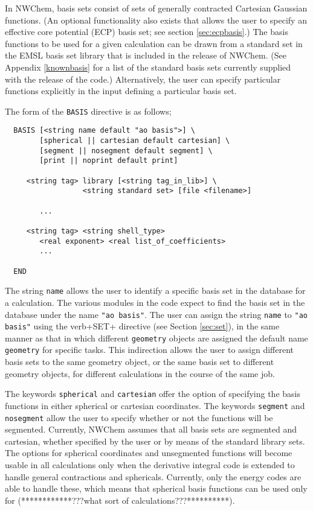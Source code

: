 \label{sec:basis}
In NWChem, basis sets consist of sets of generally contracted Cartesian
Gaussian functions.  (An optional functionality also exists that allows the
user to specify an effective core potential (ECP) basis set; see
section \ref{sec:ecpbasis}.)  The basis functions to be used for a given
calculation can be drawn from a standard set in the EMSL basis set library
that is included in the release of NWChem.  (See Appendix \ref{knownbasis} 
for a list of the standard basis sets currently supplied with the release 
of the code.)    Alternatively, the user can specify particular functions
explicitly in the input defining a particular basis set.  

The form of the \verb+BASIS+ directive is as follows;

\begin{verbatim}
  BASIS [<string name default "ao basis">] \
        [spherical || cartesian default cartesian] \
        [segment || nosegment default segment] \
        [print || noprint default print]

     <string tag> library [<string tag_in_lib>] \
                  <string standard set> [file <filename>]

        ...

     <string tag> <string shell_type>
        <real exponent> <real list_of_coefficients>
        ...
     
  END
\end{verbatim}    

The string \verb+name+ allows the user to identify a specific basis set
in the database for a calculation.  The various modules in the code expect 
to find the
basis set in the database under the name \verb+"ao basis"+.  The user can
assign the string \verb+name+ to \verb+"ao basis"+ using the verb+SET+
directive (see Section \ref{sec:set}), in the same manner as that in
which different 
\verb+geometry+ objects are assigned the default name \verb+geometry+ 
for specific tasks.  This indirection allows the user to assign different
basis sets to the same geometry object, or the same basis set to different
geometry objects, for different calculations in
the course of the same job.

The keywords \verb+spherical+ and \verb+cartesian+ offer the option of
specifying the basis functions in either spherical or cartesian coordinates.
The keywords \verb+segment+ and \verb+nosegment+ allow the user to specify
whether or not the functions will be segmented.  Currently, NWChem assumes
that all basis sets are segmented  and cartesian, whether specified by the 
user or by means of the standard library sets.
The options for spherical coordinates and unsegmented functions will become
usable in all calculations only when the derivative integral code is 
extended to handle 
general contractions and sphericals.  Currently, only the energy codes are
able to handle these, which means that spherical basis functions can be used
only for (************???what sort of calculations???**********).

